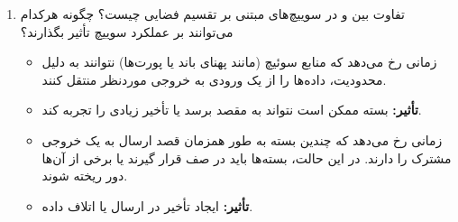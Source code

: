 \begin{enumerate}
	
	
	\item 
	تفاوت بین  و  در سوییچ‌های مبتنی بر تقسیم فضایی چیست؟ چگونه هرکدام می‌توانند بر عملکرد سوییچ تأثیر بگذارند؟
	\begin{qsolve}
		\begin{itemize}
			\item 
			\textbf{} زمانی رخ می‌دهد که منابع سوئیچ (مانند پهنای باند یا پورت‌ها) نتوانند به دلیل محدودیت، داده‌ها را از یک ورودی به خروجی موردنظر منتقل کنند.
			
			
			\item 
			\textbf{تأثیر:} بسته ممکن است نتواند به مقصد برسد یا تأخیر زیادی را تجربه کند.
			
			\item 
			\textbf{} زمانی رخ می‌دهد که چندین بسته به طور همزمان قصد ارسال به یک خروجی مشترک را دارند. در این حالت، بسته‌ها باید در صف قرار گیرند یا برخی از آن‌ها دور ریخته شوند.
			
			\item 
			\textbf{تأثیر:} ایجاد تأخیر در ارسال یا اتلاف داده.
		\end{itemize}
	\end{qsolve}
	\newpage
	\end{enumerate}
	
	
	
